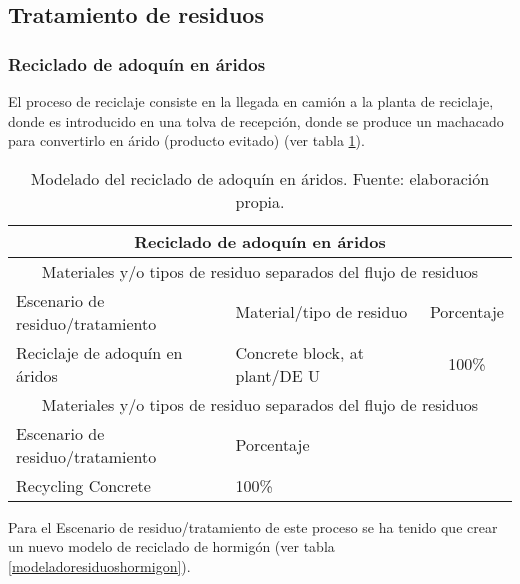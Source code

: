 \subsection{Tratamiento de residuos}
\subsubsection{Reciclado de adoquín en áridos}
El proceso de reciclaje consiste en la llegada en camión a la planta de reciclaje, donde es introducido en una tolva de recepción, donde se produce un machacado para convertirlo en árido (producto evitado) \cite{monografia,gerd} (ver tabla \ref{modeladorecicladoenaridos}).

\begin{table}[!htb]
\centering
\begin{tabular}{p{8cm}p{2cm}c}
\toprule
\multicolumn{3}{c}{Reciclado de adoquín en áridos}\\
\midrule
\multicolumn{3}{c}{Materiales y/o tipos de residuo separados del flujo de residuos}\\
\midrule
Escenario de residuo/tratamiento & Material/tipo de residuo & Porcentaje\\
\midrule
Reciclaje de adoquín en áridos & Concrete block, at plant/DE U & 100\%\\
\midrule
\multicolumn{3}{c}{Materiales y/o tipos de residuo separados del flujo de residuos}\\
\midrule
Escenario de residuo/tratamiento & Porcentaje & \\
\midrule
Recycling Concrete & 100\% & \\
\bottomrule
\end{tabular}
\caption[Modelado del reciclado de adoquín en áridos.]{Modelado del reciclado de adoquín en áridos. Fuente: elaboración propia.}
\label{modeladorecicladoenaridos}
\end{table}

Para el Escenario de residuo/tratamiento de este proceso se ha tenido que crear un nuevo modelo de reciclado de hormigón \cite{nrmca} (ver tabla \ref{modeladoresiduoshormigon}).

